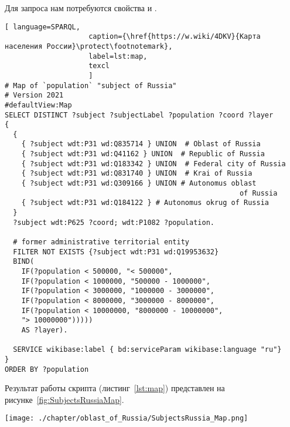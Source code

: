 Для запроса нам потребуются свойства  и .

\begin{lstlisting}[ language=SPARQL, 
                    caption={\href{https://w.wiki/4DKV}{Карта населения России}\protect\footnotemark},
                    label=lst:map,
                    texcl 
                    ]
# Map of `population` "subject of Russia"
# Version 2021
#defaultView:Map
SELECT DISTINCT ?subject ?subjectLabel ?population ?coord ?layer
{
  {
    { ?subject wdt:P31 wd:Q835714 } UNION  # Oblast of Russia
    { ?subject wdt:P31 wd:Q41162 } UNION  # Republic of Russia
    { ?subject wdt:P31 wd:Q183342 } UNION  # Federal city of Russia
    { ?subject wdt:P31 wd:Q831740 } UNION  # Krai of Russia
    { ?subject wdt:P31 wd:Q309166 } UNION # Autonomus oblast 
                                                        of Russia
    { ?subject wdt:P31 wd:Q184122 } # Autonomus okrug of Russia
  }   
  ?subject wdt:P625 ?coord; wdt:P1082 ?population.
  
  # former administrative territorial entity
  FILTER NOT EXISTS {?subject wdt:P31 wd:Q19953632}
  BIND(
    IF(?population < 500000, "< 500000",
    IF(?population < 1000000, "500000 - 1000000",
    IF(?population < 3000000, "1000000 - 3000000",
    IF(?population < 8000000, "3000000 - 8000000",
    IF(?population < 10000000, "8000000 - 10000000",
    "> 10000000")))))
    AS ?layer).
  
  SERVICE wikibase:label { bd:serviceParam wikibase:language "ru"}
}
ORDER BY ?population
\end{lstlisting}%

Результат работы скрипта (листинг~\protect\ref{lst:map}) представлен на рисунке~\ref{fig:SubjectsRussiaMap}.

\begin{fullwidth}
\begin{figure*}[h]
	\texttt{[image: ./chapter/oblast\_of\_Russia/SubjectsRussia\_Map.png]}
	\caption[Карта населения России, 2021.]{Карта населения Российской Федерации, 2021. Карта субъектов Российской Федерации, разделённых на 6 групп по количеству населения и отмеченных разными цветами в зависимости от группы, в которую субъект входит. Карта построена на основе данных, полученных с помощью запроса~\protect\ref{lst:map}.}%
      \label{fig:SubjectsRussiaMap}%
\end{figure*} 
\end{fullwidth}

